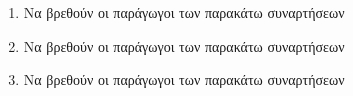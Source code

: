 \begin{enumerate}
\item Να βρεθούν οι παράγωγοι των παρακάτω συναρτήσεων
\begin{multicols}{3}
\end{multicols}
\item Να βρεθούν οι παράγωγοι των παρακάτω συναρτήσεων
\begin{multicols}{3}
\end{multicols}
\item Να βρεθούν οι παράγωγοι των παρακάτω συναρτήσεων
\begin{multicols}{2}
\end{multicols}
\end{enumerate}
